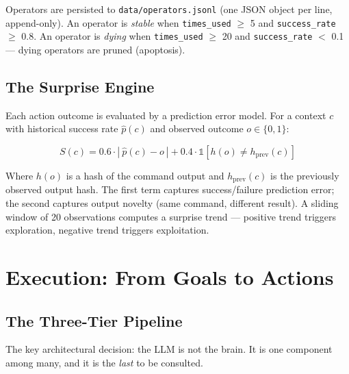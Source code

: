 \documentclass[12pt,a4paper]{report}
\begin{document}
Operators are persisted to \texttt{data/operators.jsonl} (one JSON object per line, append-only). An operator is \emph{stable} when \texttt{times\_used} $\geq$ 5 and \texttt{success\_rate} $\geq$ 0.8. An operator is \emph{dying} when \texttt{times\_used} $\geq$ 20 and \texttt{success\_rate} $<$ 0.1 --- dying operators are pruned (apoptosis).

\section{The Surprise Engine}
Each action outcome is evaluated by a prediction error model. For a context $c$ with historical success rate $\hat{p}(c)$ and observed outcome $o \in \{0, 1\}$:

\begin{equation}
S(c) = 0.6 \cdot |~\hat{p}(c) - o~| + 0.4 \cdot \mathbb{1}[h(o) \neq h_{\text{prev}}(c)]
\end{equation}

Where $h(o)$ is a hash of the command output and $h_{\text{prev}}(c)$ is the previously observed output hash. The first term captures success/failure prediction error; the second captures output novelty (same command, different result). A sliding window of 20 observations computes a surprise trend --- positive trend triggers exploration, negative trend triggers exploitation.

\chapter{Execution: From Goals to Actions}

\section{The Three-Tier Pipeline}

The key architectural decision: the LLM is not the brain. It is one component among many, and it is the \emph{last} to be consulted.
\end{document}
